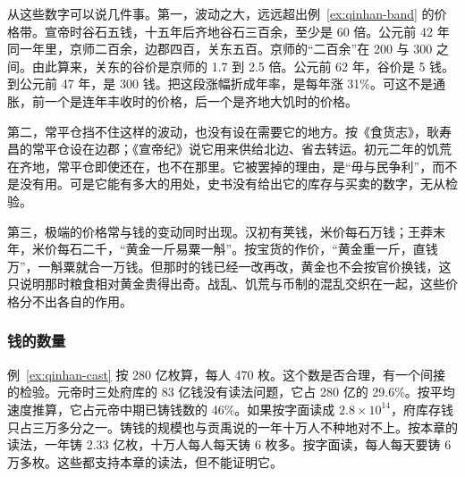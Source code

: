 从这些数字可以说几件事。第一，波动之大，远远超出例~\ref{ex:qinhan-band} 的价格带。宣帝时谷石五钱，十五年后齐地谷石三百余，至少是 60 倍。公元前 42 年同一年里，京师二百余，边郡四百，关东五百。京师的“二百余”在 200 与 300 之间。由此算来，关东的谷价是京师的 1.7 到 2.5 倍。公元前 62 年，谷价是 5 钱。到公元前 47 年，是 300 钱。把这段涨幅折成年率，是每年涨 31\%。可这不是通胀，前一个是连年丰收时的价格，后一个是齐地大饥时的价格。

第二，常平仓挡不住这样的波动，也没有设在需要它的地方。按《食货志》，耿寿昌的常平仓设在边郡；《宣帝纪》说它用来供给北边、省去转运。初元二年的饥荒在齐地，常平仓即使还在，也不在那里。它被罢掉的理由，是“毋与民争利”，而不是没有用。可是它能有多大的用处，史书没有给出它的库存与买卖的数字，无从检验。

第三，极端的价格常与钱的变动同时出现。汉初有荚钱，米价每石万钱；王莽末年，米价每石二千，“黄金一斤易粟一斛”\cite{houhanshu}。按宝货的作价，“黄金重一斤，直钱万”\cite{hanshu}，一斛粟就合一万钱。但那时的钱已经一改再改，黄金也不会按官价换钱，这只说明那时粮食相对黄金贵得出奇。战乱、饥荒与币制的混乱交织在一起，这些价格分不出各自的作用。

\subsubsection{钱的数量}
例~\ref{ex:qinhan-cast} 按 280 亿枚算，每人 470 枚。这个数是否合理，有一个间接的检验。元帝时三处府库的 83 亿钱没有读法问题，它占 280 亿的 29.6\%。按平均速度推算，它占元帝中期已铸钱数的 46\%。如果按字面读成 $2.8\times10^{14}$，府库存钱只占三万多分之一。铸钱的规模也与贡禹说的一年十万人不种地对不上。按本章的读法，一年铸 2.33 亿枚，十万人每人每天铸 6 枚多。按字面读，每人每天要铸 6 万多枚。这些都支持本章的读法，但不能证明它。


